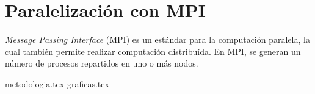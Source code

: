 \section{Paralelización con MPI}
\textit{Message Passing Interface} (MPI) es un estándar para la computación paralela, la cual también permite realizar computación distribuída. En MPI, se generan un número de procesos repartidos en uno o más nodos.

{metodologia.tex}
{graficas.tex}